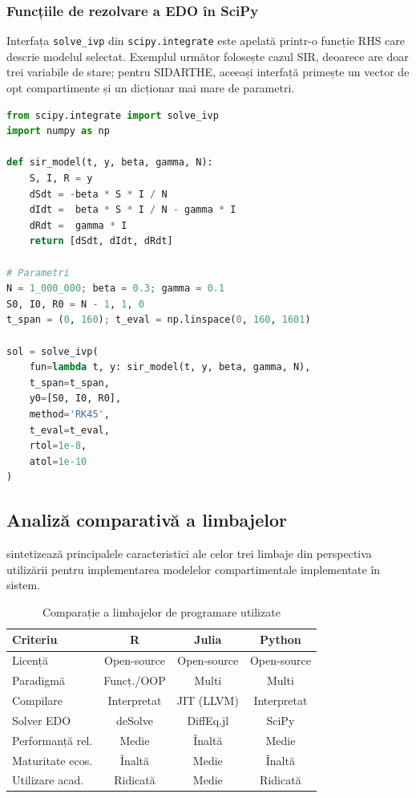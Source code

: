 \subsubsection{Funcțiile de rezolvare a EDO în SciPy}

Interfața \texttt{solve\_ivp} din \texttt{scipy.integrate} este apelată printr-o
funcție RHS care descrie modelul selectat. Exemplul următor folosește cazul SIR,
deoarece are doar trei variabile de stare; pentru SIDARTHE, aceeași
interfață primește un vector de opt compartimente și un dicționar mai
mare de parametri.
\begin{lstlisting}[language=Python, caption={Interfața solve\_ivp din SciPy pentru un sistem compartimental SIR}]
from scipy.integrate import solve_ivp
import numpy as np

def sir_model(t, y, beta, gamma, N):
    S, I, R = y
    dSdt = -beta * S * I / N
    dIdt =  beta * S * I / N - gamma * I
    dRdt =  gamma * I
    return [dSdt, dIdt, dRdt]

# Parametri
N = 1_000_000; beta = 0.3; gamma = 0.1
S0, I0, R0 = N - 1, 1, 0
t_span = (0, 160); t_eval = np.linspace(0, 160, 1601)

sol = solve_ivp(
    fun=lambda t, y: sir_model(t, y, beta, gamma, N),
    t_span=t_span,
    y0=[S0, I0, R0],
    method='RK45',
    t_eval=t_eval,
    rtol=1e-8,
    atol=1e-10
)
\end{lstlisting}

\subsection{Analiză comparativă a limbajelor}
\label{subsec:comparatie_limbaje}

 sintetizează principalele caracteristici ale
celor trei limbaje din perspectiva utilizării pentru implementarea modelelor
compartimentale implementate în sistem.

\begin{table}[t]
\centering
\caption[Comparația limbajelor (R/Julia/Python)]{Comparație a limbajelor de programare utilizate}
\label{tab:comparatie_limbaje}
\renewcommand{\arraystretch}{1.3}
\begin{tabular}{lccc}
\toprule
\textbf{Criteriu} & \textbf{R} & \textbf{Julia} & \textbf{Python} \\
\midrule
Licență          & Open-source & Open-source & Open-source \\
Paradigmă        & Funcț./OOP  & Multi       & Multi       \\
Compilare        & Interpretat & JIT (LLVM)  & Interpretat \\
Solver EDO       & deSolve     & DiffEq.jl   & SciPy       \\
Performanță rel. & Medie       & Înaltă      & Medie       \\
Maturitate ecos. & Înaltă      & Medie       & Înaltă      \\
Utilizare acad.  & Ridicată    & Medie       & Ridicată    \\
\bottomrule
\end{tabular}
\end{table}

